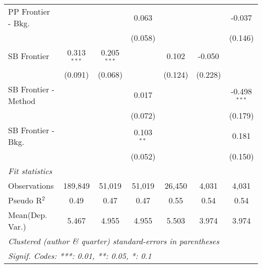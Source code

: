 \begin{tabular}{lcccccc}
   PP Frontier - Bkg.   &               &               & 0.063        &              &         & -0.037\\   
                        &               &               & (0.058)      &              &         & (0.146)\\   
   SB Frontier          & 0.313$^{***}$ & 0.205$^{***}$ &              & 0.102        & -0.050  &   \\   
                        & (0.091)       & (0.068)       &              & (0.124)      & (0.228) &   \\   
   SB Frontier - Method &               &               & 0.017        &              &         & -0.498$^{***}$\\   
                        &               &               & (0.072)      &              &         & (0.179)\\   
   SB Frontier - Bkg.   &               &               & 0.103$^{**}$ &              &         & 0.181\\   
                        &               &               & (0.052)      &              &         & (0.150)\\   
   \midrule
   \emph{Fit statistics}\\
   Observations         & 189,849       & 51,019        & 51,019       & 26,450       & 4,031   & 4,031\\  
   Pseudo R$^2$         & 0.49          & 0.47          & 0.47         & 0.55         & 0.54    & 0.54\\  
Mean(Dep. Var.) & 5.467 & 4.955 & 4.955 & 5.503 & 3.974 & 3.974 \\
   \midrule \midrule
   \multicolumn{7}{l}{\emph{Clustered (author \& quarter) standard-errors in parentheses}}\\
   \multicolumn{7}{l}{\emph{Signif. Codes: ***: 0.01, **: 0.05, *: 0.1}}\\
\end{tabular}
\par\endgroup
